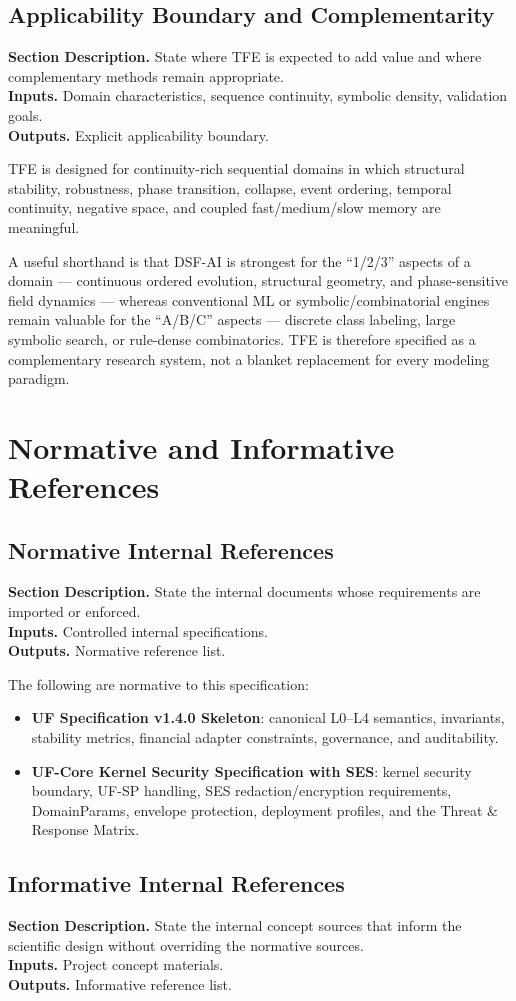\documentclass[11pt]{report}
\newcommand{\meta}[3]{\textbf{Section Description.} #1\\
\textbf{Inputs.} #2\\
\textbf{Outputs.} #3\par}
\begin{document}
\section{Applicability Boundary and Complementarity}
\meta{State where TFE is expected to add value and where complementary methods remain appropriate.}{Domain characteristics, sequence continuity, symbolic density, validation goals.}{Explicit applicability boundary.}

TFE is designed for continuity-rich sequential domains in which structural stability, robustness, phase transition, collapse, event ordering, temporal continuity, negative space, and coupled fast/medium/slow memory are meaningful.

A useful shorthand is that DSF-AI is strongest for the ``1/2/3'' aspects of a domain --- continuous ordered evolution, structural geometry, and phase-sensitive field dynamics --- whereas conventional ML or symbolic/combinatorial engines remain valuable for the ``A/B/C'' aspects --- discrete class labeling, large symbolic search, or rule-dense combinatorics. TFE is therefore specified as a complementary research system, not a blanket replacement for every modeling paradigm.

\chapter{Normative and Informative References}
\section{Normative Internal References}
\meta{State the internal documents whose requirements are imported or enforced.}{Controlled internal specifications.}{Normative reference list.}

The following are normative to this specification:
\begin{itemize}
    \item \textbf{UF Specification v1.4.0 Skeleton}: canonical L0--L4 semantics, invariants, stability metrics, financial adapter constraints, governance, and auditability.
    \item \textbf{UF-Core Kernel Security Specification with SES}: kernel security boundary, UF-SP handling, SES redaction/encryption requirements, DomainParams, envelope protection, deployment profiles, and the Threat \& Response Matrix.
\end{itemize}

\section{Informative Internal References}
\meta{State the internal concept sources that inform the scientific design without overriding the normative sources.}{Project concept materials.}{Informative reference list.}
\end{document}
